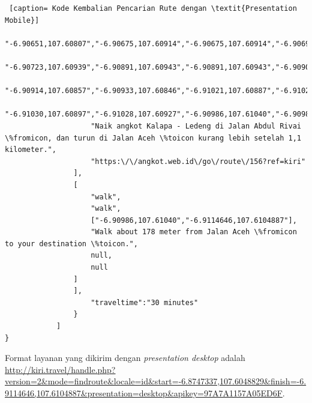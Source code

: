 \begin{lstlisting} [caption= Kode Kembalian Pencarian Rute dengan \textit{Presentation Mobile}]
					"-6.90651,107.60807","-6.90675,107.60914","-6.90675,107.60914","-6.90694,107.60939",
					"-6.90723,107.60939","-6.90891,107.60943","-6.90891,107.60943","-6.90909,107.60934",
					"-6.90914,107.60857","-6.90933,107.60846","-6.91021,107.60887","-6.91021,107.60887",
					"-6.91030,107.60897","-6.91028,107.60927","-6.90986,107.61040","-6.90986,107.61040"],
					"Naik angkot Kalapa - Ledeng di Jalan Abdul Rivai \%fromicon, dan turun di Jalan Aceh \%toicon kurang lebih setelah 1,1 kilometer.",
					"https:\/\/angkot.web.id\/go\/route\/156?ref=kiri"
				],
				[
					"walk",
					"walk",
					["-6.90986,107.61040","-6.9114646,107.6104887"],
					"Walk about 178 meter from Jalan Aceh \%fromicon to your destination \%toicon.",
					null,
					null
				]
				],
					"traveltime":"30 minutes"
				}
			]
}
\end{lstlisting}

Format layanan yang dikirim dengan \textit{presentation desktop} adalah \\
\url{http://kiri.travel/handle.php?version=2&mode=findroute&locale=id&start=-6.8747337,107.6048829&finish=-6.9114646,107.6104887&presentation=desktop&apikey=97A7A1157A05ED6F}.

